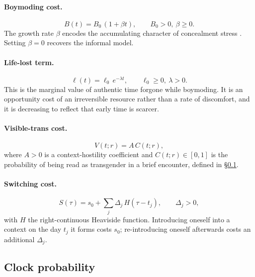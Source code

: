 \documentclass[11pt,a4paper]{article}
\theoremstyle{remark}
\begin{document}
\paragraph{Boymoding cost.}
\begin{equation}
  B(t) = B_0\,(1+\beta t), \qquad B_0>0,\ \beta\ge 0. \label{eq:B}
\end{equation}
The growth rate $\beta$ encodes the accumulating character of concealment stress \cite{pachankis2007}. Setting $\beta=0$ recovers the informal model.

\paragraph{Life-lost term.}
\begin{equation}
  \ell(t) = \ell_0\,e^{-\lambda t}, \qquad \ell_0\ge 0,\ \lambda>0. \label{eq:ell}
\end{equation}
This is the marginal value of authentic time forgone while boymoding. It is an opportunity cost of an irreversible resource rather than a rate of discomfort, and it is decreasing to reflect that early time is scarcer.

\paragraph{Visible-trans cost.}
\begin{equation}
  V(t;r) = A\,C(t;r), \label{eq:V}
\end{equation}
where $A>0$ is a context-hostility coefficient and $C(t;r)\in[0,1]$ is the probability of being read as transgender in a brief encounter, defined in \S\ref{sec:clock}.

\paragraph{Switching cost.}
\begin{equation}
  S(\tau) = s_0 + \sum_j \Delta_j\, H(\tau - t_j), \qquad \Delta_j>0, \label{eq:S}
\end{equation}
with $H$ the right-continuous Heaviside function. Introducing oneself into a context on the day $t_j$ it forms costs $s_0$; re-introducing oneself afterwards costs an additional $\Delta_j$.

\subsection{Clock probability}
\label{sec:clock}
\end{document}
